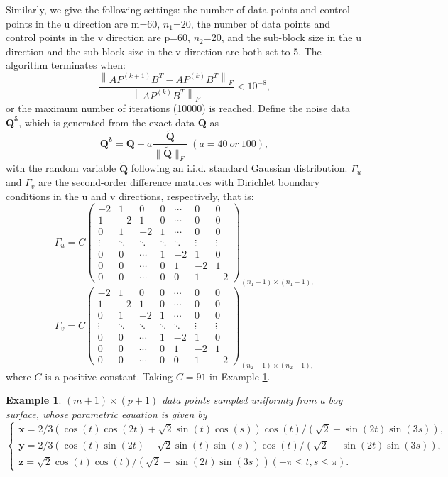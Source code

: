 \documentclass[11pt]{article}
\newtheorem{example}{Example}[section]
\numberwithin{equation}{section}
\begin{document}
Similarly, we give the following settings: the number of data points and control points in the u direction are m=60, $n_1$=20, the number of data points and control points in the v direction are p=60, $n_2$=20, and the sub-block size in the u direction and the sub-block size in the v direction are both set to 5. The algorithm terminates when:
$$
\frac{\left\|A P^{(k+1)} B^T-A P^{(k)} B^T\right\|_F}{\left\|A P^{(k)} B^T\right\|_F}<10^{-8},
$$
or the maximum number of iterations (10000) is reached. Define the noise data ${\boldsymbol{Q^\delta}}$, which is generated from the exact data $\boldsymbol{Q}$ as
$$
{\boldsymbol{Q^\delta}}={\boldsymbol{Q}}+a \frac{\widetilde{\boldsymbol{Q}}}{\|\widetilde{\boldsymbol{Q}}\|_F}~(a=40~or~100),
$$
with the random variable $\widetilde{\boldsymbol{Q}}$ following an i.i.d. standard Gaussian distribution.
$\Gamma_u$ and $\Gamma_v$ are the second-order difference matrices with Dirichlet boundary conditions in the u and v directions, respectively, that is:
\[
\Gamma_u = 
C\begin{pmatrix}
-2 & 1 & 0 & 0 & \cdots & 0 & 0 \\
1 & -2 & 1 & 0 & \cdots & 0 & 0 \\
0 & 1 & -2 & 1 & \cdots & 0 & 0 \\
\vdots & \ddots & \ddots & \ddots & \ddots & \vdots & \vdots \\
0 & 0 & \cdots & 1 & -2 & 1 & 0 \\
0 & 0 & \cdots & 0 & 1 & -2 & 1 \\
0 & 0 & \cdots & 0 & 0 & 1 & -2
\end{pmatrix}_{(n_1+1) \times (n_1+1),}
\]
\[
\Gamma_v = 
C\begin{pmatrix}
-2 & 1 & 0 & 0 & \cdots & 0 & 0 \\
1 & -2 & 1 & 0 & \cdots & 0 & 0 \\
0 & 1 & -2 & 1 & \cdots & 0 & 0 \\
\vdots & \ddots & \ddots & \ddots & \ddots & \vdots & \vdots \\
0 & 0 & \cdots & 1 & -2 & 1 & 0 \\
0 & 0 & \cdots & 0 & 1 & -2 & 1 \\
0 & 0 & \cdots & 0 & 0 & 1 & -2
\end{pmatrix}_{(n_2+1) \times (n_2+1),}
\]
where $C$ is a positive constant. Taking $C=91$ in Example \ref{example 7.3}.

\begin{example}\label{example 7.3}
$(m+1) \times(p+1)$ data points sampled uniformly from a boy surface, whose parametric equation is given by\\
$$
\left\{\begin{array}{l}
\boldsymbol{x}=2 / 3(\cos (t) \cos (2 t)+\sqrt{2} \sin (t) \cos (s)) \cos (t) /(\sqrt{2}-\sin (2 t) \sin (3 s)), \\ 
\boldsymbol{y}=2 / 3(\cos (t) \sin (2 t)-\sqrt{2} \sin (t) \sin (s)) \cos (t) /(\sqrt{2}-\sin (2 t) \sin (3 s)), \\ 
\boldsymbol{z}=\sqrt{2} \cos (t) \cos (t) /(\sqrt{2}-\sin (2 t) \sin (3 s))(-\pi \leq t, s \leq \pi) .\end{array}\right.
$$
\end{example}
\end{document}
